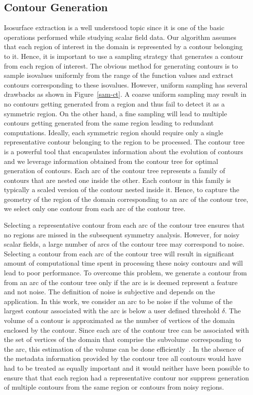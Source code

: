 \documentclass[review,journal]{vgtc}         %
\begin{document}
\subsection{Contour Generation}\label{congen}
Isosurface extraction is a well understood topic since it is one of the basic
operations performed while studying scalar field data. Our algorithm assumes that
each region of interest in the domain is represented by a contour belonging to it.
Hence, it is important to use a sampling strategy that generates a contour from each
region of interest. The obvious method for generating contours is 
to sample isovalues uniformly from the range of the function values and extract contours 
corresponding to these isovalues. However, uniform sampling has several drawbacks as shown 
in Figure~\ref{sam-ct}. A coarse uniform sampling may result in no contours getting 
generated from a region and thus fail to detect it as a symmetric region. On the other hand, 
a fine sampling will lead to multiple contours getting generated from the same region 
leading to redundant computations. Ideally, each symmetric region should require only a single 
representative contour belonging to the region to be processed.
The contour tree is a powerful tool that encapsulates information about the evolution of contours 
and we leverage information obtained from the contour tree for optimal generation of contours. 
Each arc of the contour tree represents a family of contours that are nested one inside the other.
Each contour in this family is typically a scaled version of the contour nested inside it. 
Hence, to capture the geometry of the region of the domain corresponding to an arc of the contour tree, 
we select only one contour from each arc of the contour tree.

Selecting a representative contour from each arc of the contour tree ensures that no regions
are missed in the subsequent symmetry analysis. However, for noisy scalar fields, a large
number of arcs of the contour tree may correspond to noise. Selecting a contour from each
arc of the contour tree will result in significant amount of computational time spent in
processing these noisy contours and will lead to poor performance. To overcome this problem,
we generate a contour from from an arc of the contour tree only if the arc is is deemed represent
a feature and not noise. The definition of noise is subjective and depends on the application.
In this work, we consider an arc to be noise if the volume of the 
largest contour associated with the arc is below a user defined threshold $\delta$. The volume of a
contour is approximated as the number of vertices of the domain enclosed by the contour. 
Since each arc of the contour tree can be associated with the set of vertices of the domain 
that comprise the subvolume corresponding to the arc, this estimation of the volume can be done 
efficiently~\cite{CarrSP10}. In the absence of the metadata information provided by the contour tree 
all contours would have had to be treated as equally important and it would neither have been possible to ensure
that that each region had a representative contour nor suppress generation of multiple contours from the 
same region or contours from noisy regions.
\end{document}
